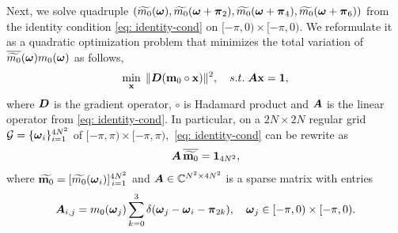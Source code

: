 Next, we solve quadruple $(\widetilde{m_{0}}(\boldsymbol{\omega}), \widetilde{m_{0}}(\boldsymbol{\omega}+\boldsymbol{\pi}_{2}), \widetilde{m_{0}}(\boldsymbol{\omega}+\boldsymbol{\pi}_{4}), \widetilde{m_{0}}(\boldsymbol{\omega}+\boldsymbol{\pi}_{6}))$ from the identity condition \eqref{eq: identity-cond} on $[-\pi, 0)\times[-\pi, 0 )$. We reformulate it as a quadratic optimization problem that minimizes the total variation of $\overline{\widetilde{m_{0}}}(\boldsymbol{\omega})m_0(\boldsymbol{\omega})$ as follows,
\begin{align}\label{eq: opt}
\min_{\mathbf{x}}\; \Vert \boldsymbol{D}(\mathbf{m}_0\circ\mathbf{x})\Vert^2,\quad 
s.t. \; \boldsymbol{A}\mathbf{x} = \mathbf{1},
\end{align}
where $\boldsymbol{D}$ is the gradient operator, $\circ$ is Hadamard product and $\boldsymbol{A}$ is the linear operator from \eqref{eq: identity-cond}. In particular, on a $2N\times 2N$ regular grid $\mathcal{G}=\{\boldsymbol{\omega}_i\}_{i=1}^{4N^2}$ of $[-\pi, \pi)\times[-\pi, \pi), $ \eqref{eq: identity-cond} can be rewrite as
\begin{align}
\V{A}\, \overline{\widetilde{\mathbf{m}_0}}= \mathbf{1}_{4N^2}, \label{eq: m0-A}%
\end{align}
where $\widetilde{\mathbf{m}_0} = [\widetilde{m_0}(\boldsymbol{\omega}_i)]_{\,i=1}^{4N^2}$ and $\boldsymbol{A}\in \mathbb{C}^{N^2\times 4N^2}$ is a sparse matrix with entries 
$$\boldsymbol{A}_{i,j} = m_0(\boldsymbol{\omega}_j)\sum_{k=0}^3\delta(\boldsymbol{\omega}_j-\boldsymbol{\omega}_i-\boldsymbol{\pi}_{2k}), \quad \boldsymbol{\omega}_j \in [-\pi,0)\times[-\pi,0).$$

